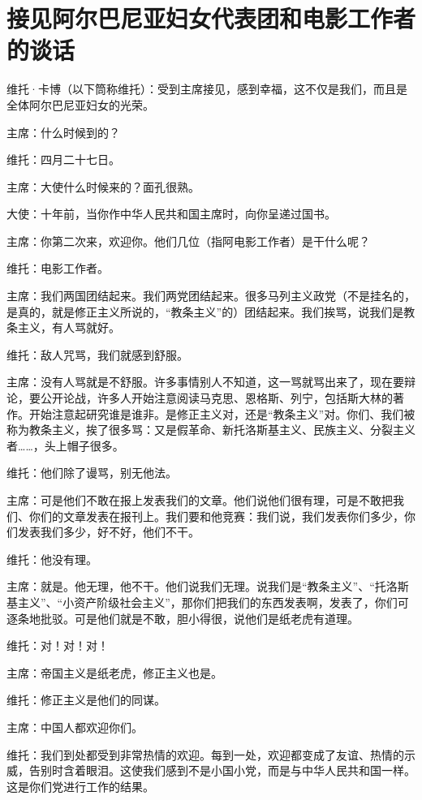 \section[接见阿尔巴尼亚妇女代表团和电影工作者的谈话（一九六四年五月十五日）]{接见阿尔巴尼亚妇女代表团和电影工作者的谈话}


维托·卡博（以下筒称维托）：受到主席接见，感到幸福，这不仅是我们，而且是全体阿尔巴尼亚妇女的光荣。

主席：什么时候到的？

维托：四月二十七日。

主席：大使什么时候来的？面孔很熟。

大使：十年前，当你作中华人民共和国主席时，向你呈递过国书。

主席：你第二次来，欢迎你。他们几位（指阿电影工作者）是干什么呢？

维托：电影工作者。

主席：我们两国团结起来。我们两党团结起来。很多马列主义政党（不是挂名的，是真的，就是修正主义所说的，“教条主义”的）团结起来。我们挨骂，说我们是教条主义，有人骂就好。

维托：敌人咒骂，我们就感到舒服。

主席：没有人骂就是不舒服。许多事情别人不知道，这一骂就骂出来了，现在要辩论，要公开论战，许多人开始注意阅读马克思、恩格斯、列宁，包括斯大林的著作。开始注意起研究谁是谁非。是修正主义对，还是“教条主义”对。你们、我们被称为教条主义，挨了很多骂：又是假革命、新托洛斯基主义、民族主义、分裂主义者……，头上帽子很多。

维托：他们除了谩骂，别无他法。

主席：可是他们不敢在报上发表我们的文章。他们说他们很有理，可是不敢把我们、你们的文章发表在报刊上。我们要和他竞赛：我们说，我们发表你们多少，你们发表我们多少，好不好，他们不干。

维托：他没有理。

主席：就是。他无理，他不干。他们说我们无理。说我们是“教条主义”、“托洛斯基主义”、“小资产阶级社会主义”，那你们把我们的东西发表啊，发表了，你们可逐条地批驳。可是他们就是不敢，胆小得很，说他们是纸老虎有道理。

维托：对！对！对！

主席：帝国主义是纸老虎，修正主义也是。

维托：修正主义是他们的同谋。

主席：中国人都欢迎你们。

维托：我们到处都受到非常热情的欢迎。每到一处，欢迎都变成了友谊、热情的示威，告别时含着眼泪。这使我们感到不是小国小党，而是与中华人民共和国一样。这是你们党进行工作的结果。

